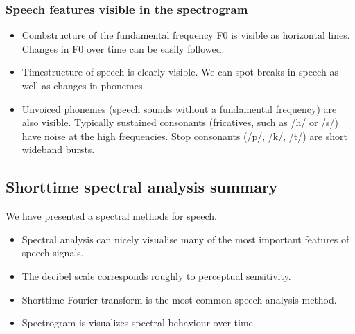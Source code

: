 \documentclass[letterpaper,10pt,english]{jupyterBook}
\begin{document}
\subsubsection{Speech features visible in the spectrogram}
\label{\detokenize{Representations/Short-time_analysis:speech-features-visible-in-the-spectrogram}}\begin{itemize}
\item {} 
\sphinxAtStartPar
Comb\sphinxhyphen{}structure of the fundamental frequency F0 is visible as horizontal lines. Changes in F0 over time can be easily followed.

\item {} 
\sphinxAtStartPar
Time\sphinxhyphen{}structure of speech is clearly visible. We can spot breaks in speech as well as changes in phonemes.

\item {} 
\sphinxAtStartPar
Unvoiced phonemes (speech sounds without a fundamental frequency) are also visible. Typically sustained consonants (fricatives, such as /h/ or /s/) have noise at the high frequencies.
Stop consonants (/p/, /k/, /t/) are short wide\sphinxhyphen{}band bursts.

\end{itemize}


\subsection{Short\sphinxhyphen{}time spectral analysis summary}
\label{\detokenize{Representations/Short-time_analysis:short-time-spectral-analysis-summary}}
\sphinxAtStartPar
We have presented a spectral  methods for speech.
\begin{itemize}
\item {} 
\sphinxAtStartPar
Spectral analysis can nicely visualise many of the most important
features of speech signals.

\item {} 
\sphinxAtStartPar
The decibel scale corresponds roughly to perceptual sensitivity.

\item {} 
\sphinxAtStartPar
Short\sphinxhyphen{}time Fourier transform is the most common speech analysis method.

\item {} 
\sphinxAtStartPar
Spectrogram is visualizes spectral behaviour over time.

\end{itemize}
\end{document}
